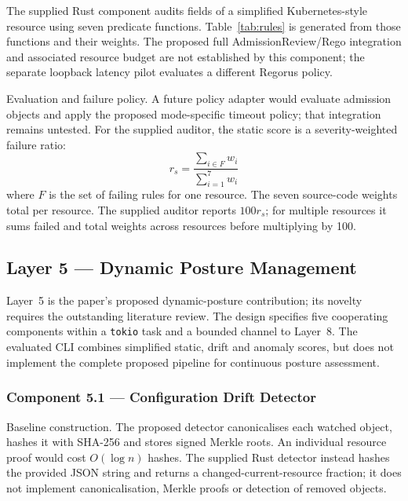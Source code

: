 \documentclass{ieeeaccess}
\renewcommand{\textbf}[1]{#1}
\begin{document}
The supplied Rust component audits fields of a simplified Kubernetes-style resource using seven predicate functions. Table~\ref{tab:rules} is generated from those functions and their weights. The proposed full AdmissionReview/Rego integration and associated resource budget are not established by this component; the separate loopback latency pilot evaluates a different Regorus policy.

\begin{table}[ht]
\caption{The Seven Rules in the Supplied Rust Auditor}
\label{tab:rules}
\centering
\setlength{\tabcolsep}{3pt}

\end{table}

\noindent\textbf{Evaluation and failure policy.} A future policy adapter would evaluate admission objects and apply the proposed mode-specific timeout policy; that integration remains untested. For the supplied auditor, the static score is a severity-weighted failure ratio:
\begin{equation}
r_s = \frac{\sum_{i \in F} w_i}{\sum_{i=1}^{7} w_i}
\label{eq:static}
\end{equation}
where $F$ is the set of failing rules for one resource. The seven source-code weights total  per resource. The supplied auditor reports $100r_s$; for multiple resources it sums failed and total weights across resources before multiplying by 100.

\subsection{Layer 5 --- Dynamic Posture Management}
\label{subsec:layer5}

Layer~5 is the paper's proposed dynamic-posture contribution; its novelty requires the outstanding literature review. The design specifies five cooperating components within a \texttt{tokio} task and a bounded channel to Layer~8. The evaluated CLI combines simplified static, drift and anomaly scores, but does not implement the complete proposed pipeline for continuous posture assessment.

\subsubsection{Component 5.1 --- Configuration Drift Detector}
\label{subsubsec:drift}

\noindent\textbf{Baseline construction.} The proposed detector canonicalises each watched object, hashes it with SHA-256 and stores signed Merkle roots. An individual resource proof would cost $O(\log n)$ hashes. The supplied Rust detector instead hashes the provided JSON string and returns a changed-current-resource fraction; it does not implement canonicalisation, Merkle proofs or detection of removed objects.
\end{document}
